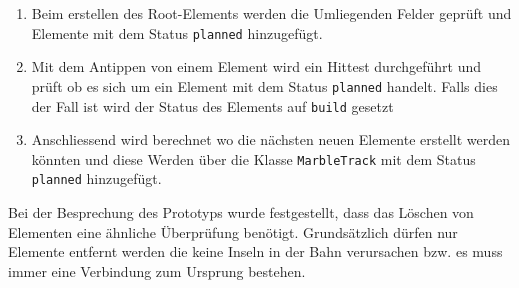 \begin{description}
	\begin{enumerate}
		\item Beim erstellen des Root-Elements werden die Umliegenden Felder geprüft und Elemente mit dem Status \texttt{planned} hinzugefügt.
		\item Mit dem Antippen von einem Element wird ein Hittest durchgeführt und prüft ob es sich um ein Element mit dem Status \texttt{planned} handelt. Falls dies der Fall ist wird der Status des Elements auf \texttt{build} gesetzt
		\item Anschliessend wird berechnet wo die nächsten neuen Elemente erstellt werden könnten und diese Werden über die Klasse \texttt{MarbleTrack} mit dem Status \texttt{planned} hinzugefügt.
	\end{enumerate}

	Bei der Besprechung des Prototyps wurde festgestellt, dass das Löschen von Elementen eine ähnliche Überprüfung benötigt. Grundsätzlich dürfen nur Elemente entfernt werden die keine Inseln in der Bahn verursachen bzw. es muss immer eine Verbindung zum Ursprung bestehen.

\end{description}
